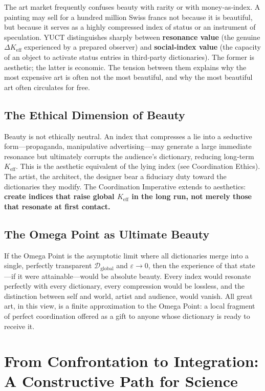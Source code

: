 \documentclass[12pt,a4paper]{article}
\newcommand{\Keff}{K_{\mathrm{eff}}}
\begin{document}
	The art market frequently confuses beauty with rarity or with money‑as‑index. A painting may sell for a hundred million Swiss francs not because it is beautiful, but because it serves as a highly compressed index of status or an instrument of speculation. YUCT distinguishes sharply between \textbf{resonance value} (the genuine $\Delta\Keff$ experienced by a prepared observer) and \textbf{social‑index value} (the capacity of an object to activate status entries in third‑party dictionaries). The former is aesthetic; the latter is economic. The tension between them explains why the most expensive art is often not the most beautiful, and why the most beautiful art often circulates for free.
	
	\subsection{The Ethical Dimension of Beauty}
	
	Beauty is not ethically neutral. An index that compresses a lie into a seductive form---propaganda, manipulative advertising---may generate a large immediate resonance but ultimately corrupts the audience’s dictionary, reducing long‑term $K_{\mathrm{eff}}$. This is the aesthetic equivalent of the lying index (see Coordination Ethics). The artist, the architect, the designer bear a fiduciary duty toward the dictionaries they modify. The Coordination Imperative extends to aesthetics: \textbf{create indices that raise global $K_{\mathrm{eff}}$ in the long run, not merely those that resonate at first contact.}
	
	\subsection{The Omega Point as Ultimate Beauty}
	
	If the Omega Point is the asymptotic limit where all dictionaries merge into a single, perfectly transparent $\mathcal{D}_{\text{global}}$ and $\varepsilon \to 0$, then the experience of that state---if it were attainable---would be absolute beauty. Every index would resonate perfectly with every dictionary, every compression would be lossless, and the distinction between self and world, artist and audience, would vanish. All great art, in this view, is a finite approximation to the Omega Point: a local fragment of perfect coordination offered as a gift to anyone whose dictionary is ready to receive it.
	
	\section{From Confrontation to Integration: A Constructive Path for Science}
	
\end{document}
